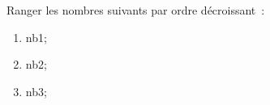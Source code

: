\documentclass[exercice]{thedocument}%
\begin{document}
%
Ranger les nombres suivants par ordre décroissant~:
    \begin{enumerate}
        \item \<nb1;
        \item \<nb2;
        \item \<nb3;
    \end{enumerate}
\end{document}
